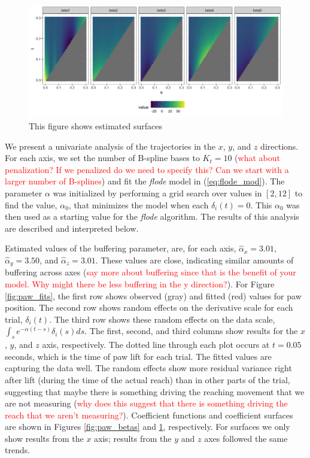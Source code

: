 \documentclass[preprint]{JASA}
\begin{document}
\begin{figure}
\includegraphics[width=\reprintcolumnwidth]{../output/fig_data_surfaces-1} \caption{This figure shows estimated surfaces}\label{fig:paw_surfaces}
\end{figure}

We present a univariate analysis of the trajectories in the \(x\),
\(y\), and \(z\) directions. For each axis, we set the number of
B-spline bases to \(K_t = 10\)
(\textcolor{red}{what about penalization? If we penalized do we need to specify this? Can we start with a larger number of B-splines})
and fit the \emph{flode} model in (\ref{eq:flode_mod}). The parameter
\(\alpha\) was initialized by performing a grid search over values in
\([2, 12]\) to find the value, \(\alpha_0\), that minimizes the model
when each \(\delta_i(t) = 0\). This \(\alpha_0\) was then used as a
starting value for the \emph{flode} algorithm. The results of this
analysis are described and interpreted below.

Estimated values of the buffering parameter, are, for each axis,
\(\widehat{\alpha}_x = 3.01\), \(\widehat{\alpha}_y = 3.50\), and
\(\widehat{\alpha}_z = 3.01\). These values are close, indicating
similar amounts of buffering across axes
(\textcolor{red}{say more about buffering since that is the benefit of your model. Why might there be less buffering in the y direction?}).
For Figure \ref{fig:paw_fits}, the first row shows observed (gray) and
fitted (red) values for paw position. The second row shows random
effects on the derivative scale for each trial, \(\delta_i(t)\). The
third row shows these random effects on the data scale,
\(\int_s e^{-\alpha (t-s)}\delta_i(s)ds\). The first, second, and third
columns show results for the \(x\), \(y\), and \(z\) axis, respectively.
The dotted line through each plot occurs at \(t= 0.05\) seconds, which
is the time of paw lift for each trial. The fitted values are capturing
the data well. The random effects show more residual variance right
after lift (during the time of the actual reach) than in other parts of
the trial, suggesting that maybe there is something driving the reaching
movement that we are not measuring
(\textcolor{red}{why does this suggest that there is something driving the reach that we aren't measuring?}).
Coefficient functions and coefficient surfaces are shown in Figures
\ref{fig:paw_betas} and \ref{fig:paw_surfaces}, respectively. For
surfaces we only show results from the \(x\) axis; results from the
\(y\) and \(z\) axes followed the same trends.
\end{document}
